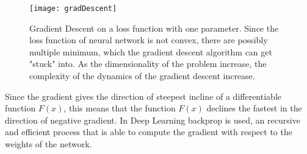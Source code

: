 \begin{figure}[h!]
  \centering
  \texttt{[image: gradDescent]}
	\caption[Gradient Descent]{Gradient Descent on a loss function with one parameter. Since the loss function of neural network is not convex, there are possibly multiple minimum, which the gradient descent algorithm can get "stuck" into. As the dimensionality of the problem increase, the complexity of the dynamics of the gradient descent increase.}
  \label{fig:gradDesc}
\end{figure}

Since the gradient gives the direction of steepest incline of a differentiable function $F(x)$, this means that the function $F(x)$ declines the fastest in the direction of negative gradient. In Deep Learning \gls{backprop} is used, an recursive and efficient process that is able to compute the gradient with respect to the \gls{weights} of the network.

